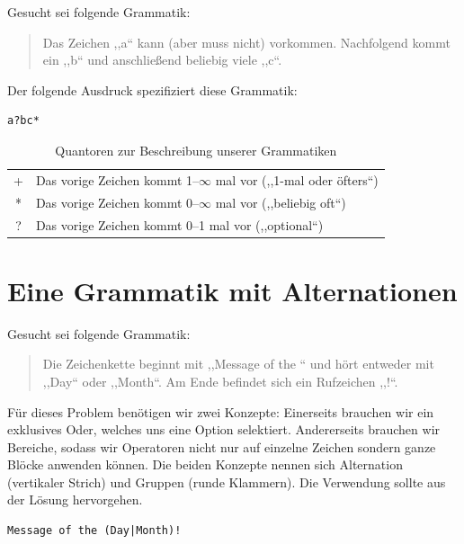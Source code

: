 Gesucht sei folgende Grammatik:
\begin{quote}
  Das Zeichen ,,a`` kann (aber muss nicht) vorkommen. Nachfolgend kommt ein ,,b`` und anschließend beliebig viele ,,c``.
\end{quote}

Der folgende Ausdruck spezifiziert diese Grammatik:
\begin{lstlisting}
a?bc*
\end{lstlisting}

\begin{table}[ht]
 \begin{center}
  \begin{tabular}{cl}
   \hline
    + & Das vorige Zeichen kommt 1--$\infty$ mal vor (,,1-mal oder öfters``) \\
    * & Das vorige Zeichen kommt 0--$\infty$ mal vor (,,beliebig oft``) \\
    ? & Das vorige Zeichen kommt 0--1 mal vor (,,optional``) \\
   \hline
  \end{tabular}
  \caption{Quantoren zur Beschreibung unserer Grammatiken}
  \label{tab:quantifiers}
 \end{center}
\end{table}

\section{Eine Grammatik mit Alternationen}
%
Gesucht sei folgende Grammatik:
\begin{quote}
  Die Zeichenkette beginnt mit ,,Message of the `` und hört entweder mit ,,Day`` oder ,,Month``. Am Ende befindet sich ein Rufzeichen ,,!``.
\end{quote}

Für dieses Problem benötigen wir zwei Konzepte: Einerseits brauchen wir ein exklusives Oder, welches uns eine Option selektiert. Andererseits brauchen wir Bereiche, sodass wir Operatoren nicht nur auf einzelne Zeichen sondern ganze Blöcke anwenden können. Die beiden Konzepte nennen sich Alternation (vertikaler Strich) und Gruppen (runde Klammern). Die Verwendung sollte aus der Lösung hervorgehen.

\begin{lstlisting}
Message of the (Day|Month)!
\end{lstlisting}

